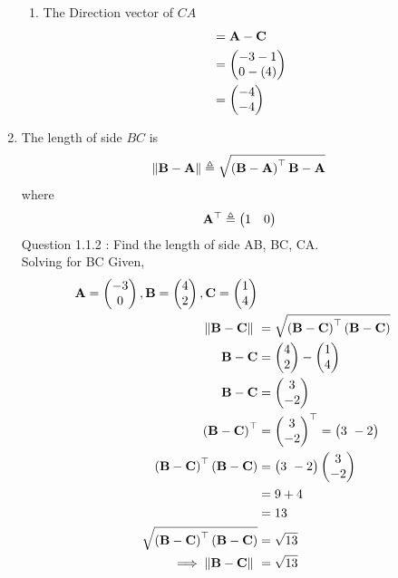 \documentclass[11pt]{book}
\begin{document}
\begin{enumerate}[label=\thesection.\arabic*.,ref=\thesection.\theenumi]
\begin{enumerate}
  \item  The Direction vector of $CA$  \begin{align} &= \mathbf{A} - \mathbf{C} \\ 
 &= \begin{pmatrix} -3 - 1\\ 0 - (4) \end{pmatrix} \\&= \begin{pmatrix} -4\\ -4 \end{pmatrix}
  \end{align}
 \end{enumerate}

\item The length of side $BC$ is 
		\begin{align}
			\left\lVert\mathbf{B}-\mathbf{A}\right\rVert \triangleq \sqrt{\left(\mathbf{B}-\mathbf{A}\right)^{\top}{\mathbf{B}-\mathbf{A}}}
		\end{align}
		where
		\begin{align}
			\mathbf{A}^{\top}\triangleq\begin{pmatrix}1 & 0\end{pmatrix}
		\end{align}
Question 1.1.2 : Find the length of side AB, BC, CA.\\
\solution
Solving for BC
Given, 
\begin{align}
\vec{A} = \myvec{-3\\0},
\vec{B} = \myvec{4\\2},
\vec{C} = \myvec{1\\4} \\  
 \norm{\vec{B}-\vec{C}}\ &=  \sqrt{\brak{\vec{B}-\vec{C}}^{\top}\brak{\vec{B}-\vec{C}}} \\
 \vec{B}-\vec{C} &= \myvec{4\\ 2} - \myvec{1 \\ 4} \\
 \vec{B}-\vec{C} &= \myvec{3\\ -2} \\
 \brak{\vec{B}-\vec{C}}^{\top} &= {\myvec{3\\ -2}}^{\top} = \myvec{3 \ -2} \\
\brak{\vec{B}-\vec{C}}^{\top}\brak{\vec{B}-\vec{C}} &= \myvec{3\ -2} \myvec{3 \\ -2}\\
             &= 9+4 \\
             &= 13 \\  
 \sqrt{\brak{\vec{B}-\vec{C}}^{\top}\brak{\vec{B}-\vec{C}}} &= \sqrt{13}	\\
	\implies \norm{\vec{B}-\vec{C}}\ &= \sqrt{13}
\end{align}


\end{enumerate}
\end{document}
